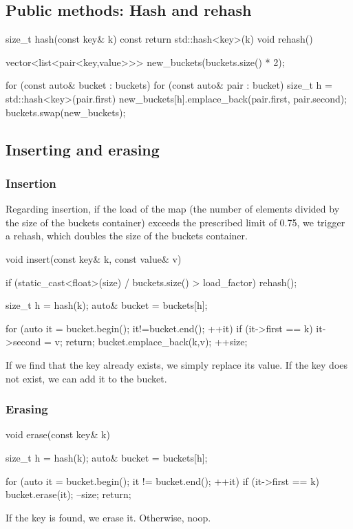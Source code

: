 \documentclass{report}
\begin{document}
 \bigbreak \noindent 
 \subsection{Public methods: Hash and rehash}
 \bigbreak \noindent 
 \begin{cppcode}
     size_t hash(const key& k) const {
         return std::hash<key>{}(k) %
     }
     void rehash() {
         vector<list<pair<key,value>>> new_buckets(buckets.size() * 2);

         for (const auto& bucket : buckets) {
             for (const auto& pair : bucket) {
                 size_t h = std::hash<key>{}(pair.first) %
                 new_buckets[h].emplace_back(pair.first, pair.second);
             }
         }
         buckets.swap(new_buckets);
     }
 \end{cppcode}

 \bigbreak \noindent 
 \subsection{Inserting and erasing}
 \bigbreak \noindent 
 \subsubsection{Insertion}
 \bigbreak \noindent 
 Regarding insertion, if the load of the map (the number of elements divided by the size of the buckets container) exceeds the prescribed limit of 0.75, we trigger a rehash, which doubles the size of the buckets container.
 \bigbreak \noindent 
 \begin{cppcode}
     void insert(const key& k, const value& v) {
         if (static_cast<float>(size) / buckets.size() > load_factor) {
             rehash();
         } 

         size_t h = hash(k);        
         auto& bucket = buckets[h];

         for (auto it = bucket.begin(); it!=bucket.end(); ++it) {
             if (it->first == k) {
                 it->second = v;
                 return;
             }
         }
         bucket.emplace_back(k,v);
         ++size;
     }
 \end{cppcode}
 \bigbreak \noindent 
 If we find that the key already exists, we simply replace its value. If the key does not exist, we can add it to the bucket.
 \bigbreak \noindent 
 \subsubsection{Erasing}
 \bigbreak \noindent 
 \begin{cppcode}
     void erase(const key& k) {
         size_t h = hash(k);
         auto& bucket = buckets[h];

         for (auto it = bucket.begin(); it != bucket.end(); ++it) {
             if (it->first == k) {
                 bucket.erase(it);
                 --size;
                 return;
             }
         }
     }
 \end{cppcode}
 \bigbreak \noindent 
 If the key is found, we erase it. Otherwise, noop.
\end{document}
